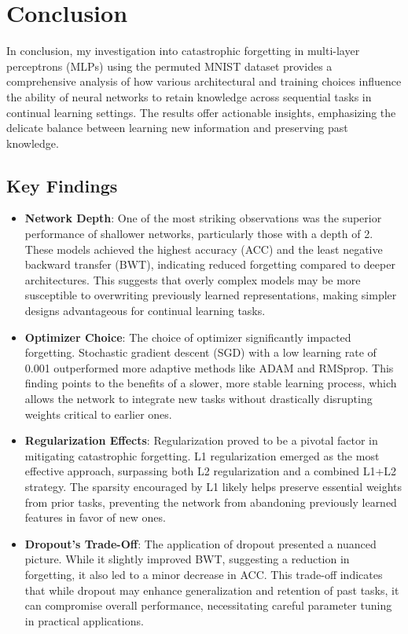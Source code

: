 \documentclass{article}
\begin{document}
\section{Conclusion}
In conclusion, my investigation into catastrophic forgetting in multi-layer perceptrons (MLPs) using the permuted MNIST dataset provides a comprehensive analysis of how various architectural and training choices influence the ability of neural networks to retain knowledge across sequential tasks in continual learning settings. The results offer actionable insights, emphasizing the delicate balance between learning new information and preserving past knowledge.

\subsection{Key Findings}
\begin{itemize}
    \item \textbf{Network Depth}: One of the most striking observations was the superior performance of shallower networks, particularly those with a depth of 2. These models achieved the highest accuracy (ACC) and the least negative backward transfer (BWT), indicating reduced forgetting compared to deeper architectures. This suggests that overly complex models may be more susceptible to overwriting previously learned representations, making simpler designs advantageous for continual learning tasks.
    
    \item \textbf{Optimizer Choice}: The choice of optimizer significantly impacted forgetting. Stochastic gradient descent (SGD) with a low learning rate of 0.001 outperformed more adaptive methods like ADAM and RMSprop. This finding points to the benefits of a slower, more stable learning process, which allows the network to integrate new tasks without drastically disrupting weights critical to earlier ones.
    
    \item \textbf{Regularization Effects}: Regularization proved to be a pivotal factor in mitigating catastrophic forgetting. L1 regularization emerged as the most effective approach, surpassing both L2 regularization and a combined L1+L2 strategy. The sparsity encouraged by L1 likely helps preserve essential weights from prior tasks, preventing the network from abandoning previously learned features in favor of new ones.
    
    \item \textbf{Dropout’s Trade-Off}: The application of dropout presented a nuanced picture. While it slightly improved BWT, suggesting a reduction in forgetting, it also led to a minor decrease in ACC. This trade-off indicates that while dropout may enhance generalization and retention of past tasks, it can compromise overall performance, necessitating careful parameter tuning in practical applications.
\end{itemize}
\end{document}
